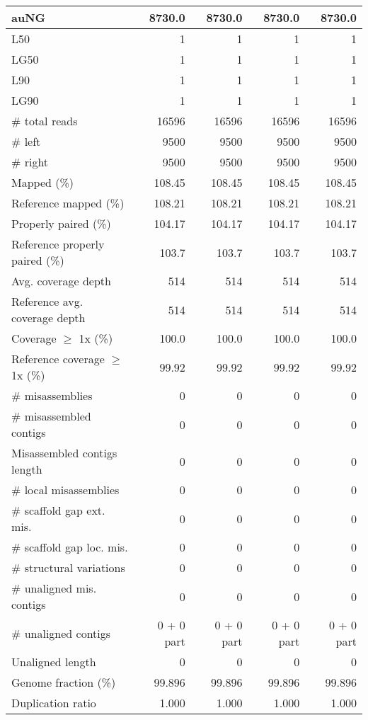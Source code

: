 \documentclass[12pt,a4paper]{article}
\begin{document}
\begin{table}[ht]
\begin{center}
\begin{tabular}{|l*{4}{|r}|}
auNG & 8730.0 & 8730.0 & 8730.0 & 8730.0 \\ \hline
L50 & 1 & 1 & 1 & 1 \\ \hline
LG50 & 1 & 1 & 1 & 1 \\ \hline
L90 & 1 & 1 & 1 & 1 \\ \hline
LG90 & 1 & 1 & 1 & 1 \\ \hline
\# total reads & 16596 & 16596 & 16596 & 16596 \\ \hline
\# left & 9500 & 9500 & 9500 & 9500 \\ \hline
\# right & 9500 & 9500 & 9500 & 9500 \\ \hline
Mapped (\%) & 108.45 & 108.45 & 108.45 & 108.45 \\ \hline
Reference mapped (\%) & 108.21 & 108.21 & 108.21 & 108.21 \\ \hline
Properly paired (\%) & 104.17 & 104.17 & 104.17 & 104.17 \\ \hline
Reference properly paired (\%) & 103.7 & 103.7 & 103.7 & 103.7 \\ \hline
Avg. coverage depth & 514 & 514 & 514 & 514 \\ \hline
Reference avg. coverage depth & 514 & 514 & 514 & 514 \\ \hline
Coverage $\geq$ 1x (\%) & 100.0 & 100.0 & 100.0 & 100.0 \\ \hline
Reference coverage $\geq$ 1x (\%) & 99.92 & 99.92 & 99.92 & 99.92 \\ \hline
\# misassemblies & 0 & 0 & 0 & 0 \\ \hline
\# misassembled contigs & 0 & 0 & 0 & 0 \\ \hline
Misassembled contigs length & 0 & 0 & 0 & 0 \\ \hline
\# local misassemblies & 0 & 0 & 0 & 0 \\ \hline
\# scaffold gap ext. mis. & 0 & 0 & 0 & 0 \\ \hline
\# scaffold gap loc. mis. & 0 & 0 & 0 & 0 \\ \hline
\# structural variations & 0 & 0 & 0 & 0 \\ \hline
\# unaligned mis. contigs & 0 & 0 & 0 & 0 \\ \hline
\# unaligned contigs & 0 + 0 part & 0 + 0 part & 0 + 0 part & 0 + 0 part \\ \hline
Unaligned length & 0 & 0 & 0 & 0 \\ \hline
Genome fraction (\%) & 99.896 & 99.896 & 99.896 & 99.896 \\ \hline
Duplication ratio & 1.000 & 1.000 & 1.000 & 1.000 \\ \hline

\end{tabular}
\end{center}
\end{table}
\end{document}
